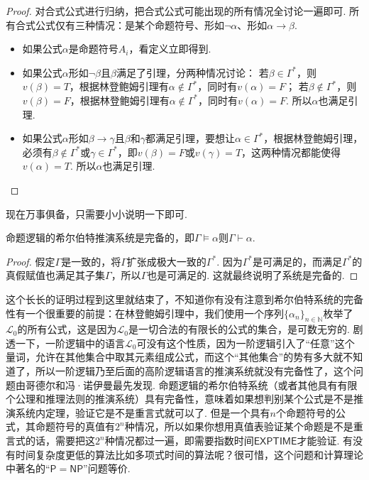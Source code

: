 \documentclass[main.tex]{subfiles}
\begin{document}
\begin{proof}
    对合式公式进行归纳，把合式公式可能出现的所有情况全讨论一遍即可. 所有合式公式仅有三种情况：是某个命题符号、形如\(\neg \alpha\)、形如\(\alpha \to \beta\).
    \begin{itemize}
        \item 如果公式\(\alpha\)是命题符号\(A_i\)，看定义立即得到. 
        \item 如果公式\(\alpha\)形如\(\neg \beta\)且\(\beta\)满足了引理，分两种情况讨论：\newline
        若\(\beta \in \Gamma^*\)，则\(v(\beta)=T\)，根据林登鲍姆引理有\(\alpha \not \in \Gamma^*\)，同时有\(v(\alpha) = F\)；\newline
        若\(\beta \not \in \Gamma^*\)，则\(v(\beta)=F\)，根据林登鲍姆引理有\(\alpha \not \in \Gamma^*\)，同时有\(v(\alpha) = F\). \newline
        所以\(\alpha\)也满足引理. 
        \item 如果公式\(\alpha\)形如\(\beta \to \gamma\)且\(\beta\)和\(\gamma\)都满足引理，要想让\(\alpha \in \Gamma^*\)，根据林登鲍姆引理，必须有\(\beta \not \in \Gamma^*\)或\(\gamma \in \Gamma^*\)，即\(v(\beta)=F\)或\(v(\gamma)=T\)，这两种情况都能使得\(v(\alpha)=T\). 所以\(\alpha\)也满足引理.
    \end{itemize}
\end{proof}

现在万事俱备，只需要小小说明一下即可.

\begin{theorem}{}
    命题逻辑的希尔伯特推演系统是完备的，即\(\Gamma \vDash \alpha\)则\(\Gamma \vdash \alpha\).
\end{theorem}

\begin{proof}
    假定\(\Gamma\)是一致的，将\(\Gamma\)扩张成极大一致的\(\Gamma^*\). 因为\(\Gamma^*\)是可满足的，而满足\(\Gamma^*\)的真假赋值也满足其子集\(\Gamma\)，所以\(\Gamma\)也是可满足的. 这就最终说明了系统是完备的.
\end{proof}

这个长长的证明过程到这里就结束了，不知道你有没有注意到希尔伯特系统的完备性有一个很重要的前提：在林登鲍姆引理中，我们使用一个序列\(\{\alpha_n\}_{n \in \mathbb{N}}\)枚举了\(\mathcal{L}_0\)的所有公式，这是因为\(\mathcal{L}_0\)是一切合法的有限长的公式的集合，是可数无穷的. 剧透一下，一阶逻辑中的语言\(\mathcal{L}_0\)可没有这个性质，因为一阶逻辑引入了“任意”这个量词，允许在其他集合中取其元素组成公式，而这个“其他集合”的势有多大就不知道了，所以一阶逻辑乃至后面的高阶逻辑语言的推演系统就没有完备性了，这个问题由哥德尔和冯·诺伊曼最先发现. 命题逻辑的希尔伯特系统（或者其他具有有限个公理和推理法则的推演系统）具有完备性，意味着如果想判别某个公式是不是推演系统内定理，验证它是不是重言式就可以了. 但是一个具有\(n\)个命题符号的公式，其命题符号的真值有\(2^n\)种情况，所以如果你想用真值表验证某个命题是不是重言式的话，需要把这\(2^n\)种情况都过一遍，即需要指数时间\(\mathsf{EXPTIME}\)才能验证. 有没有时间复杂度更低的算法比如多项式时间的算法呢？很可惜，这个问题和计算理论中著名的“\(\mathsf{P} = \mathsf{NP}\)”问题等价. 
\end{document}
